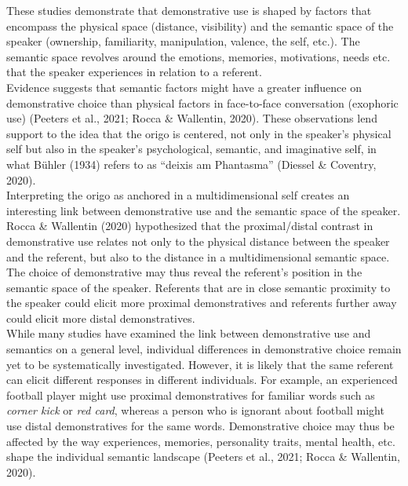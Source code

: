 \documentclass[11pt, a4paper]{article}
\begin{document}
These studies demonstrate that demonstrative use is shaped by factors that encompass the physical space (distance, visibility) and the semantic space of the speaker (ownership, familiarity, manipulation, valence, the self, etc.). The semantic space revolves around the emotions, memories, motivations, needs etc. that the speaker experiences in relation to a referent.\\
Evidence suggests that semantic factors might have a greater influence on demonstrative choice than physical factors in face-to-face conversation (exophoric use) (Peeters et al., 2021; Rocca \& Wallentin, 2020). These observations lend support to the idea that the origo is centered, not only in the speaker’s physical self but also in the speaker’s psychological, semantic, and imaginative self, in what Bühler (1934) refers to as “deixis am Phantasma” (Diessel \& Coventry, 2020). \\

Interpreting the origo as anchored in a multidimensional self creates an interesting link between demonstrative use and the semantic space of the speaker. Rocca \& Wallentin (2020) hypothesized that the proximal/distal contrast in demonstrative use relates not only to the physical distance between the speaker and the referent, but also to the distance in a multidimensional semantic space. The choice of demonstrative may thus reveal the referent’s position in the semantic space of the speaker. Referents that are in close semantic proximity to the speaker could elicit more proximal demonstratives and referents further away could elicit more distal demonstratives. \\

While many studies have examined the link between demonstrative use and semantics on a general level, individual differences in demonstrative choice remain yet to be systematically investigated. However, it is likely that the same referent can elicit different responses in different individuals. For example, an experienced football player might use proximal demonstratives for familiar words such as \textit{corner kick} or \textit{red card}, whereas a person who is ignorant about football might use distal demonstratives for the same words. Demonstrative choice may thus be affected by the way experiences, memories, personality traits, mental health, etc. shape the individual semantic landscape (Peeters et al., 2021; Rocca & Wallentin, 2020). 
\end{document}

